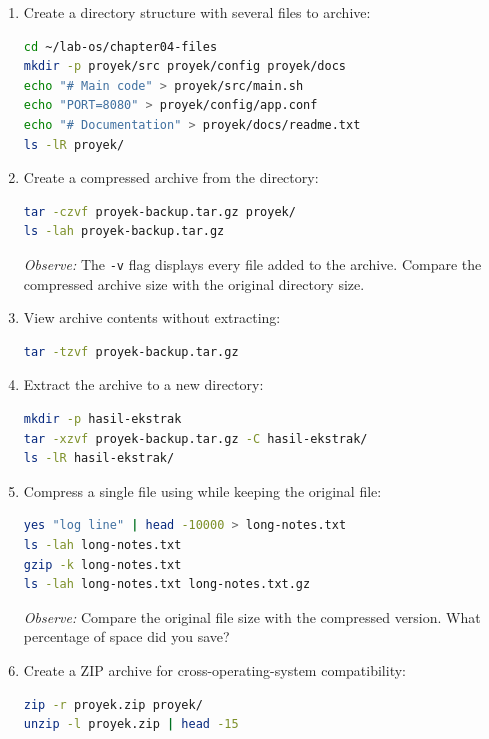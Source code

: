 \begin{enumerate}
    \item Create a directory structure with several files to archive:
\begin{lstlisting}[language=bash, caption={Preparing a directory to archive}]
cd ~/lab-os/chapter04-files
mkdir -p proyek/src proyek/config proyek/docs
echo "# Main code" > proyek/src/main.sh
echo "PORT=8080" > proyek/config/app.conf
echo "# Documentation" > proyek/docs/readme.txt
ls -lR proyek/
\end{lstlisting}

    \item Create a compressed archive from the  directory:
\begin{lstlisting}[language=bash, caption={Creating a .tar.gz archive}]
tar -czvf proyek-backup.tar.gz proyek/
ls -lah proyek-backup.tar.gz
\end{lstlisting}
    \textit{Observe:} The \texttt{-v} flag displays every file added to the archive. Compare the compressed archive size with the original directory size.

    \item View archive contents without extracting:
\begin{lstlisting}[language=bash, caption={Viewing archive contents without extraction}]
tar -tzvf proyek-backup.tar.gz
\end{lstlisting}

    \item Extract the archive to a new directory:
\begin{lstlisting}[language=bash, caption={Extracting an archive to another directory}]
mkdir -p hasil-ekstrak
tar -xzvf proyek-backup.tar.gz -C hasil-ekstrak/
ls -lR hasil-ekstrak/
\end{lstlisting}

    \item Compress a single file using  while keeping the original file:
\begin{lstlisting}[language=bash, caption={Single-file compression with gzip}]
yes "log line" | head -10000 > long-notes.txt
ls -lah long-notes.txt
gzip -k long-notes.txt
ls -lah long-notes.txt long-notes.txt.gz
\end{lstlisting}
    \textit{Observe:} Compare the original file size with the compressed version. What percentage of space did you save?

    \item Create a ZIP archive for cross-operating-system compatibility:
\begin{lstlisting}[language=bash, caption={Creating a ZIP archive}]
zip -r proyek.zip proyek/
unzip -l proyek.zip | head -15
\end{lstlisting}
\end{enumerate}

